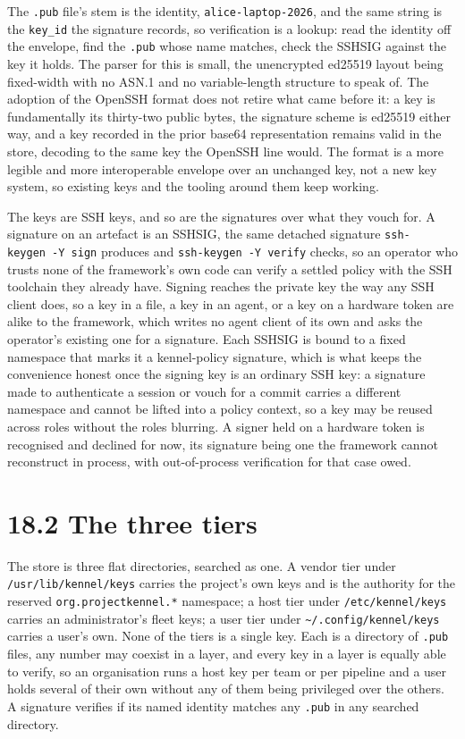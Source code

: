 The \texttt{.pub} file's stem is the identity,
\texttt{alice-laptop-2026}, and the same string is the \texttt{key\_id}
the signature records, so verification is a lookup: read the identity
off the envelope, find the \texttt{.pub} whose name matches, check the
SSHSIG against the key it holds. The parser for this is small, the
unencrypted ed25519 layout being fixed-width with no ASN.1 and no
variable-length structure to speak of. The adoption of the OpenSSH
format does not retire what came before it: a key is fundamentally its
thirty-two public bytes, the signature scheme is ed25519 either way, and
a key recorded in the prior base64 representation remains valid in the
store, decoding to the same key the OpenSSH line would. The format is a
more legible and more interoperable envelope over an unchanged key, not
a new key system, so existing keys and the tooling around them keep
working.

The keys are SSH keys, and so are the signatures over what they vouch
for. A signature on an artefact is an SSHSIG, the same detached
signature \texttt{ssh-keygen\ -Y\ sign} produces and
\texttt{ssh-keygen\ -Y\ verify} checks, so an operator who trusts none
of the framework's own code can verify a settled policy with the SSH
toolchain they already have. Signing reaches the private key the way any
SSH client does, so a key in a file, a key in an agent, or a key on a
hardware token are alike to the framework, which writes no agent client
of its own and asks the operator's existing one for a signature. Each
SSHSIG is bound to a fixed namespace that marks it a kennel-policy
signature, which is what keeps the convenience honest once the signing
key is an ordinary SSH key: a signature made to authenticate a session
or vouch for a commit carries a different namespace and cannot be lifted
into a policy context, so a key may be reused across roles without the
roles blurring. A signer held on a hardware token is recognised and
declined for now, its signature being one the framework cannot
reconstruct in process, with out-of-process verification for that case
owed.

\hypertarget{the-three-tiers}{%
\section{18.2 The three tiers}\label{the-three-tiers}}

The store is three flat directories, searched as one. A vendor tier
under \texttt{/usr/lib/kennel/keys} carries the project's own keys and
is the authority for the reserved \texttt{org.projectkennel.*}
namespace; a host tier under \texttt{/etc/kennel/keys} carries an
administrator's fleet keys; a user tier under
\texttt{\textasciitilde{}/.config/kennel/keys} carries a user's own.
None of the tiers is a single key. Each is a directory of \texttt{.pub}
files, any number may coexist in a layer, and every key in a layer is
equally able to verify, so an organisation runs a host key per team or
per pipeline and a user holds several of their own without any of them
being privileged over the others. A signature verifies if its named
identity matches any \texttt{.pub} in any searched directory.

